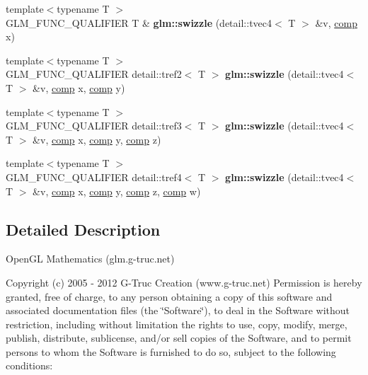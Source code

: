 \begin{DoxyCompactItemize}
\item 
\hypertarget{namespaceglm_a57cf00730195b5faf883be200f8fa45c}{{\footnotesize template$<$typename T $>$ }\\\-G\-L\-M\-\_\-\-F\-U\-N\-C\-\_\-\-Q\-U\-A\-L\-I\-F\-I\-E\-R \-T \& {\bfseries glm\-::swizzle} (detail\-::tvec4$<$ \-T $>$ \&v, \hyperlink{structcomp}{comp} x)}\label{namespaceglm_a57cf00730195b5faf883be200f8fa45c}

\item 
\hypertarget{namespaceglm_ae7b9acb2c1ba906c2fa049398e434068}{{\footnotesize template$<$typename T $>$ }\\\-G\-L\-M\-\_\-\-F\-U\-N\-C\-\_\-\-Q\-U\-A\-L\-I\-F\-I\-E\-R \*
detail\-::tref2$<$ \-T $>$ {\bfseries glm\-::swizzle} (detail\-::tvec4$<$ \-T $>$ \&v, \hyperlink{structcomp}{comp} x, \hyperlink{structcomp}{comp} y)}\label{namespaceglm_ae7b9acb2c1ba906c2fa049398e434068}

\item 
\hypertarget{namespaceglm_af470a4abb69fc8912ed2b53b1d4e0425}{{\footnotesize template$<$typename T $>$ }\\\-G\-L\-M\-\_\-\-F\-U\-N\-C\-\_\-\-Q\-U\-A\-L\-I\-F\-I\-E\-R \*
detail\-::tref3$<$ \-T $>$ {\bfseries glm\-::swizzle} (detail\-::tvec4$<$ \-T $>$ \&v, \hyperlink{structcomp}{comp} x, \hyperlink{structcomp}{comp} y, \hyperlink{structcomp}{comp} z)}\label{namespaceglm_af470a4abb69fc8912ed2b53b1d4e0425}

\item 
\hypertarget{namespaceglm_a1aff113741fa5c0bd84fe626f8d5ee78}{{\footnotesize template$<$typename T $>$ }\\\-G\-L\-M\-\_\-\-F\-U\-N\-C\-\_\-\-Q\-U\-A\-L\-I\-F\-I\-E\-R \*
detail\-::tref4$<$ \-T $>$ {\bfseries glm\-::swizzle} (detail\-::tvec4$<$ \-T $>$ \&v, \hyperlink{structcomp}{comp} x, \hyperlink{structcomp}{comp} y, \hyperlink{structcomp}{comp} z, \hyperlink{structcomp}{comp} w)}\label{namespaceglm_a1aff113741fa5c0bd84fe626f8d5ee78}

\end{DoxyCompactItemize}


\subsection{\-Detailed \-Description}
\-Open\-G\-L \-Mathematics (glm.\-g-\/truc.\-net)

\-Copyright (c) 2005 -\/ 2012 \-G-\/\-Truc \-Creation (www.\-g-\/truc.\-net) \-Permission is hereby granted, free of charge, to any person obtaining a copy of this software and associated documentation files (the \char`\"{}\-Software\char`\"{}), to deal in the \-Software without restriction, including without limitation the rights to use, copy, modify, merge, publish, distribute, sublicense, and/or sell copies of the \-Software, and to permit persons to whom the \-Software is furnished to do so, subject to the following conditions\-:

